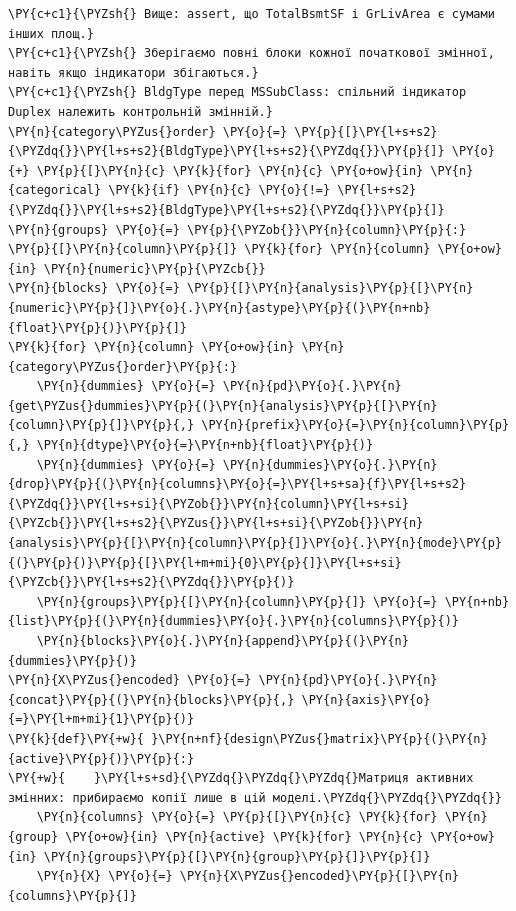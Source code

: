 \begin{Verbatim}[commandchars=\\\{\}]
\PY{c+c1}{\PYZsh{} Вище: assert, що TotalBsmtSF і GrLivArea є сумами інших площ.}
\PY{c+c1}{\PYZsh{} Зберігаємо повні блоки кожної початкової змінної, навіть якщо індикатори збігаються.}
\PY{c+c1}{\PYZsh{} BldgType перед MSSubClass: спільний індикатор Duplex належить контрольній змінній.}
\PY{n}{category\PYZus{}order} \PY{o}{=} \PY{p}{[}\PY{l+s+s2}{\PYZdq{}}\PY{l+s+s2}{BldgType}\PY{l+s+s2}{\PYZdq{}}\PY{p}{]} \PY{o}{+} \PY{p}{[}\PY{n}{c} \PY{k}{for} \PY{n}{c} \PY{o+ow}{in} \PY{n}{categorical} \PY{k}{if} \PY{n}{c} \PY{o}{!=} \PY{l+s+s2}{\PYZdq{}}\PY{l+s+s2}{BldgType}\PY{l+s+s2}{\PYZdq{}}\PY{p}{]}
\PY{n}{groups} \PY{o}{=} \PY{p}{\PYZob{}}\PY{n}{column}\PY{p}{:} \PY{p}{[}\PY{n}{column}\PY{p}{]} \PY{k}{for} \PY{n}{column} \PY{o+ow}{in} \PY{n}{numeric}\PY{p}{\PYZcb{}}
\PY{n}{blocks} \PY{o}{=} \PY{p}{[}\PY{n}{analysis}\PY{p}{[}\PY{n}{numeric}\PY{p}{]}\PY{o}{.}\PY{n}{astype}\PY{p}{(}\PY{n+nb}{float}\PY{p}{)}\PY{p}{]}
\PY{k}{for} \PY{n}{column} \PY{o+ow}{in} \PY{n}{category\PYZus{}order}\PY{p}{:}
    \PY{n}{dummies} \PY{o}{=} \PY{n}{pd}\PY{o}{.}\PY{n}{get\PYZus{}dummies}\PY{p}{(}\PY{n}{analysis}\PY{p}{[}\PY{n}{column}\PY{p}{]}\PY{p}{,} \PY{n}{prefix}\PY{o}{=}\PY{n}{column}\PY{p}{,} \PY{n}{dtype}\PY{o}{=}\PY{n+nb}{float}\PY{p}{)}
    \PY{n}{dummies} \PY{o}{=} \PY{n}{dummies}\PY{o}{.}\PY{n}{drop}\PY{p}{(}\PY{n}{columns}\PY{o}{=}\PY{l+s+sa}{f}\PY{l+s+s2}{\PYZdq{}}\PY{l+s+si}{\PYZob{}}\PY{n}{column}\PY{l+s+si}{\PYZcb{}}\PY{l+s+s2}{\PYZus{}}\PY{l+s+si}{\PYZob{}}\PY{n}{analysis}\PY{p}{[}\PY{n}{column}\PY{p}{]}\PY{o}{.}\PY{n}{mode}\PY{p}{(}\PY{p}{)}\PY{p}{[}\PY{l+m+mi}{0}\PY{p}{]}\PY{l+s+si}{\PYZcb{}}\PY{l+s+s2}{\PYZdq{}}\PY{p}{)}
    \PY{n}{groups}\PY{p}{[}\PY{n}{column}\PY{p}{]} \PY{o}{=} \PY{n+nb}{list}\PY{p}{(}\PY{n}{dummies}\PY{o}{.}\PY{n}{columns}\PY{p}{)}
    \PY{n}{blocks}\PY{o}{.}\PY{n}{append}\PY{p}{(}\PY{n}{dummies}\PY{p}{)}
\PY{n}{X\PYZus{}encoded} \PY{o}{=} \PY{n}{pd}\PY{o}{.}\PY{n}{concat}\PY{p}{(}\PY{n}{blocks}\PY{p}{,} \PY{n}{axis}\PY{o}{=}\PY{l+m+mi}{1}\PY{p}{)}
\PY{k}{def}\PY{+w}{ }\PY{n+nf}{design\PYZus{}matrix}\PY{p}{(}\PY{n}{active}\PY{p}{)}\PY{p}{:}
\PY{+w}{    }\PY{l+s+sd}{\PYZdq{}\PYZdq{}\PYZdq{}Матриця активних змінних: прибираємо копії лише в цій моделі.\PYZdq{}\PYZdq{}\PYZdq{}}
    \PY{n}{columns} \PY{o}{=} \PY{p}{[}\PY{n}{c} \PY{k}{for} \PY{n}{group} \PY{o+ow}{in} \PY{n}{active} \PY{k}{for} \PY{n}{c} \PY{o+ow}{in} \PY{n}{groups}\PY{p}{[}\PY{n}{group}\PY{p}{]}\PY{p}{]}
    \PY{n}{X} \PY{o}{=} \PY{n}{X\PYZus{}encoded}\PY{p}{[}\PY{n}{columns}\PY{p}{]}

\end{Verbatim}

